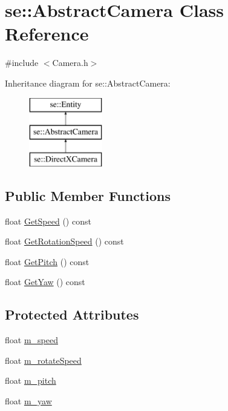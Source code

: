 \hypertarget{classse_1_1_abstract_camera}{}\section{se\+:\+:Abstract\+Camera Class Reference}
\label{classse_1_1_abstract_camera}


{\ttfamily \#include $<$Camera.\+h$>$}

Inheritance diagram for se\+:\+:Abstract\+Camera\+:\begin{figure}[H]
\begin{center}
\leavevmode
\includegraphics[height=3.000000cm]{classse_1_1_abstract_camera}
\end{center}
\end{figure}
\subsection*{Public Member Functions}
\begin{DoxyCompactItemize}
\item 
float \mbox{\hyperlink{classse_1_1_abstract_camera_a6720fc7f0712a59b8dc3d3b5f3c20dc4}{Get\+Speed}} () const
\item 
float \mbox{\hyperlink{classse_1_1_abstract_camera_a5762156f8dd3d3d79666cb2f23e45fa2}{Get\+Rotation\+Speed}} () const
\item 
float \mbox{\hyperlink{classse_1_1_abstract_camera_afe009ee2de0fa0c4d37d446bb7d91ccf}{Get\+Pitch}} () const
\item 
float \mbox{\hyperlink{classse_1_1_abstract_camera_a6064b75a70a1ea4621b82f18e4f46349}{Get\+Yaw}} () const
\end{DoxyCompactItemize}
\subsection*{Protected Attributes}
\begin{DoxyCompactItemize}
\item 
float \mbox{\hyperlink{classse_1_1_abstract_camera_a4689e12e2d96c8243ea8790301ed30a7}{m\+\_\+speed}}
\item 
float \mbox{\hyperlink{classse_1_1_abstract_camera_a354f0d31dff826d7ff56b27f0449f8ea}{m\+\_\+rotate\+Speed}}
\item 
float \mbox{\hyperlink{classse_1_1_abstract_camera_a63e8232c82227dbaa26e66411f1bcb34}{m\+\_\+pitch}}
\item 
float \mbox{\hyperlink{classse_1_1_abstract_camera_ae3b2898fd2db420ac4329c13e96a98db}{m\+\_\+yaw}}
\end{DoxyCompactItemize}



